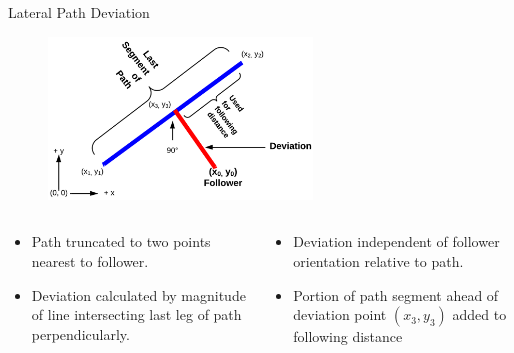 \documentclass{beamer}
\begin{document}
    \begin{frame}{Lateral Path Deviation}
      \begin{figure}[ht] \centering
        \includegraphics[width=7cm] {../graphics/devpts_diagram.png}
      \end{figure}
      \begin{columns}
        \begin{column}{0.5\textwidth}
          \begin{itemize} \scriptsize
            \item Path truncated to two points nearest to follower.
            \item Deviation calculated by magnitude of line intersecting last leg of path perpendicularly.
          \end{itemize}
        \end{column}
        \begin{column}{0.5\textwidth}
          \begin{itemize} \scriptsize
            \item Deviation independent of follower orientation relative to path.
            \item Portion of path segment ahead of deviation point $(x_3,y_3)$ added to following distance
          \end{itemize}          
        \end{column}
      \end{columns}
    \end{frame}
\end{document}
